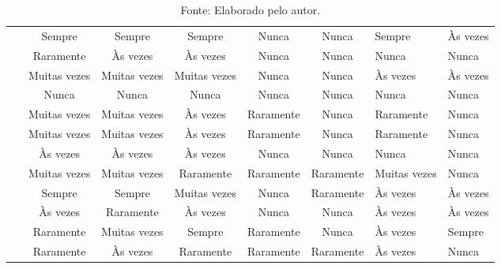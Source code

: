 \documentclass[twoside,english,brazilian]{UNISINOSartigo}
\newcommand{\source}[1]{\caption*{Fonte: {#1}} }
\begin{document}
\begin{table}[h]
\begin{tabularx}{\columnwidth}{cccccc}
~ & Sempre & Sempre & Sempre & Nunca & Nunca & Sempre & Às vezes \\ 
~ & Raramente & Às vezes & Às vezes & Nunca & Nunca & Nunca & Nunca \\ 
~ & Muitas vezes & Muitas vezes & Muitas vezes & Nunca & Nunca & Às vezes & Às vezes \\ 
~ & Nunca & Nunca & Nunca & Nunca & Nunca & Nunca & Nunca \\ 
~ & Muitas vezes & Muitas vezes & Às vezes & Raramente & Nunca & Raramente & Nunca \\ 
~ & Muitas vezes & Muitas vezes & Às vezes & Raramente & Nunca & Raramente & Nunca \\ 
~ & Às vezes & Às vezes & Às vezes & Nunca & Nunca & Nunca & Nunca \\ 
~ & Muitas vezes & Muitas vezes & Raramente & Raramente & Raramente & Muitas vezes & Nunca \\ 
~ & Sempre & Sempre & Muitas vezes & Nunca & Raramente & Às vezes & Às vezes \\ 
~ & Às vezes & Raramente & Às vezes & Nunca & Nunca & Às vezes & Às vezes \\ 
~ & Raramente & Muitas vezes & Sempre & Raramente & Nunca & Às vezes & Sempre \\ 
~ & Raramente & Às vezes & Raramente & Raramente & Raramente & Às vezes & Nunca \\  \hline
    
    \end{tabularx}
    \source{Elaborado pelo autor.}
\end{table}
\end{document}
